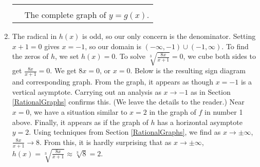 \documentclass[12pt]{ximera}
\begin{document}
\begin{example}
\begin{enumerate}
\begin{tabular}{m{2.5in}c}









&

 \\ 

& The complete graph of $y=g(x)$. \\

\end{tabular}

\item  The radical in $h(x)$ is odd, so our only concern is the denominator.  Setting $x+1=0$ gives $x=-1$, so our domain is $(-\infty, -1) \cup (-1, \infty)$.  To find the zeros of $h$, we set $h(x) = 0$. 
To solve $\sqrt[3]{\frac{8x}{x+1}} = 0$, we cube both sides to get $\frac{8x}{x+1} = 0$.  We get $8x=0$, or $x=0$. Below is the resulting sign diagram and corresponding graph. From the graph, it appears as though $x=-1$ is a vertical asymptote.  Carrying out an analysis as $x \rightarrow -1$ as in Section \ref{RationalGraphs} confirms this.  (We leave the details to the reader.)  Near $x=0$, we have a situation similar to $x=2$ in the graph of $f$ in number 1 above.  Finally, it appears as if the graph of $h$ has a horizontal asymptote $y=2$.  Using techniques from Section \ref{RationalGraphs}, we find as $x \rightarrow \pm \infty$, $\frac{8x}{x+1} \rightarrow 8$.  From this, it is hardly surprising that as $x \rightarrow \pm \infty$, $h(x) = \sqrt[3]{\frac{8x}{x+1}} \approx  \sqrt[3]{8} =2$.

\begin{tabular}{m{2.5in}c}





\end{tabular}
\end{enumerate}
\end{example}
\end{document}
